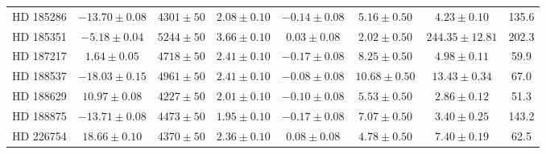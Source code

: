 \begin{table*}
\begin{tabular}{cccccccc}
HD 185286 & $-13.70 \pm 0.08$ & $4301 \pm 50$ & $2.08 \pm 0.10$ & $-0.14 \pm 0.08$ & $5.16 \pm 0.50$ & $4.23 \pm 0.10$ & 135.6 \\
HD 185351 & $-5.18 \pm 0.04$ & $5244 \pm 50$ & $3.66 \pm 0.10$ & $0.03 \pm 0.08$ & $2.02 \pm 0.50$ & $244.35 \pm 12.81$ & 202.3 \\
HD 187217 & $1.64 \pm 0.05$ & $4718 \pm 50$ & $2.41 \pm 0.10$ & $-0.17 \pm 0.08$ & $8.25 \pm 0.50$ & $4.98 \pm 0.11$ & 59.9 \\
HD 188537 & $-18.03 \pm 0.15$ & $4961 \pm 50$ & $2.41 \pm 0.10$ & $-0.08 \pm 0.08$ & $10.68 \pm 0.50$ & $13.43 \pm 0.34$ & 67.0 \\
HD 188629 & $10.97 \pm 0.08$ & $4227 \pm 50$ & $2.01 \pm 0.10$ & $-0.10 \pm 0.08$ & $5.53 \pm 0.50$ & $2.86 \pm 0.12$ & 51.3 \\
HD 188875 & $-13.71 \pm 0.08$ & $4473 \pm 50$ & $1.95 \pm 0.10$ & $-0.17 \pm 0.08$ & $7.07 \pm 0.50$ & $3.40 \pm 0.25$ & 143.2 \\
HD 226754 & $18.66 \pm 0.10$ & $4370 \pm 50$ & $2.36 \pm 0.10$ & $0.08 \pm 0.08$ & $4.78 \pm 0.50$ & $7.40 \pm 0.19$ & 62.5 \\
\hline
\end{tabular}
\end{table*}
